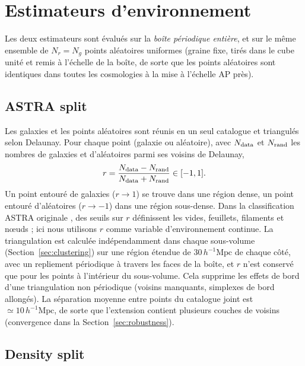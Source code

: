 \documentclass[11pt,twocolumn]{article}
\newcommand{\Mpch}{\,h^{-1}\mathrm{Mpc}}
\begin{document}
\section{Estimateurs d'environnement}
\label{sec:env}

Les deux estimateurs sont évalués sur la \emph{boîte périodique entière}, et sur le même ensemble de $N_r = N_g$ points aléatoires uniformes (graine fixe, tirés dans le cube unité et remis à l'échelle de la boîte, de sorte que les points aléatoires sont identiques dans toutes les cosmologies à la mise à l'échelle AP près).

\subsection{ASTRA split}

Les galaxies et les points aléatoires sont réunis en un seul catalogue et triangulés selon Delaunay. Pour chaque point (galaxie ou aléatoire), avec $N_{\rm data}$ et $N_{\rm rand}$ les nombres de galaxies et d'aléatoires parmi ses voisins de Delaunay,
\begin{equation}
r = \frac{N_{\rm data}-N_{\rm rand}}{N_{\rm data}+N_{\rm rand}} \in [-1,1].
\label{eq:astra_r}
\end{equation}
Un point entouré de galaxies ($r\to1$) se trouve dans une région dense, un point entouré d'aléatoires ($r\to-1$) dans une région sous-dense. Dans la classification ASTRA originale \cite{ASTRA}, des seuils sur $r$ définissent les vides, feuillets, filaments et nœuds ; ici nous utilisons $r$ comme variable d'environnement continue. La triangulation est calculée indépendamment dans chaque sous-volume (Section~\ref{sec:clustering}) sur une région étendue de $30\Mpch$ de chaque côté, avec un repliement périodique à travers les faces de la boîte, et $r$ n'est conservé que pour les points à l'intérieur du sous-volume. Cela supprime les effets de bord d'une triangulation non périodique (voisins manquants, simplexes de bord allongés). La séparation moyenne entre points du catalogue joint est $\simeq10\Mpch$, de sorte que l'extension contient plusieurs couches de voisins (convergence dans la Section~\ref{sec:robustness}).

\subsection{Density split}
\end{document}
